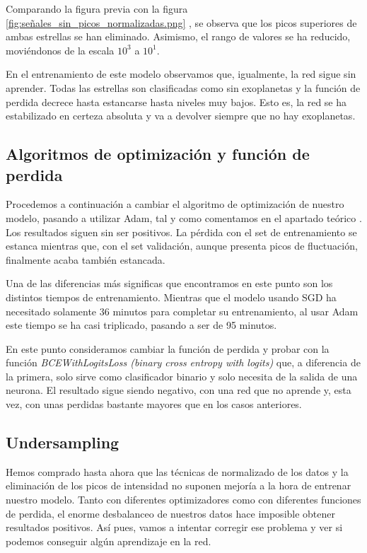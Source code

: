 Comparando la figura previa con la figura \ref{fig:señales_sin_picos_normalizadas.png} , se observa que los picos superiores de ambas estrellas se han eliminado. Asimismo, el rango de valores se ha reducido, moviéndonos de la escala $10^3$ a $10^1$.


En el entrenamiento de este modelo observamos que, igualmente, la red sigue sin aprender. Todas las estrellas son clasificadas como sin exoplanetas y la función de perdida decrece hasta estancarse hasta niveles muy bajos. Esto es, la red se ha estabilizado en certeza absoluta y va a devolver siempre que no hay exoplanetas.

\subsection{Algoritmos de optimización y función de perdida}

Procedemos a continuación a cambiar el algoritmo de optimización de nuestro modelo, pasando a utilizar Adam, tal y como comentamos en el apartado teórico . Los resultados siguen sin ser positivos. La pérdida con el set de entrenamiento se estanca mientras que, con el set validación, aunque presenta picos de fluctuación, finalmente acaba también estancada.

Una de las diferencias más significas que encontramos en este punto son los distintos tiempos de entrenamiento. Mientras que el modelo usando SGD ha necesitado solamente 36 minutos para completar su entrenamiento, al usar Adam este tiempo se ha casi triplicado, pasando a ser de 95 minutos.

En este punto consideramos cambiar la función de perdida y probar con la función \textit{BCEWithLogitsLoss (binary cross entropy with logits)} que, a diferencia de la primera, solo sirve como clasificador binario y solo necesita de la salida de una neurona. El resultado sigue siendo negativo, con una red que no aprende y, esta vez, con unas perdidas bastante mayores que en los casos anteriores.


\subsection{Undersampling}

Hemos comprado hasta ahora que las técnicas de normalizado de los datos y la eliminación de los picos de intensidad no suponen mejoría a la hora de entrenar nuestro modelo. Tanto con diferentes optimizadores como con diferentes funciones de perdida, el enorme desbalanceo de nuestros datos hace imposible obtener resultados positivos. Así pues, vamos a intentar corregir ese problema y ver si podemos conseguir algún aprendizaje en la red.

